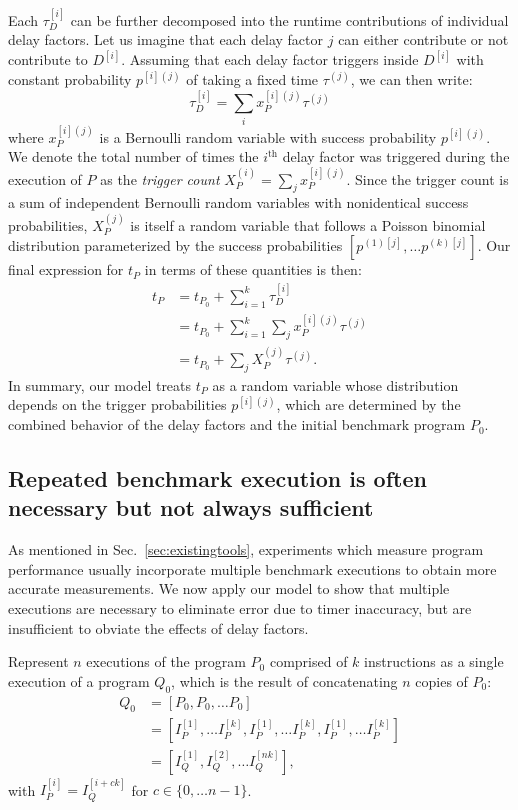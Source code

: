 \documentclass[conference]{IEEEtran}
\begin{document}
Each $\tau^{[i]}_D$ can be further decomposed into the runtime contributions of
individual delay factors. Let us imagine that each delay factor $j$ can either
contribute or not contribute to $D^{[i]}$. Assuming that each delay factor
triggers inside $D^{[i]}$ with constant probability $p^{[i](j)}$ of taking a
fixed time $\tau^{(j)}$, we can then write:
%
\begin{equation}
    \tau^{[i]}_D = \sum_{i} x_P^{[i](j)} \tau^{(j)}
\end{equation}
%
where $x_P^{[i](j)}$ is a Bernoulli random variable with success probability $p^{[i](j)}$.
We denote the total number of times the $i^{\textrm{th}}$ delay factor was triggered during
the execution of $P$ as the \textit{trigger count} $X_P^{(i)} = \sum_{j} x_P^{[i](j)}$.
Since the trigger count is a sum of independent Bernoulli random variables with nonidentical
success probabilities, $X_P^{(j)}$ is itself a random variable that follows a Poisson
binomial distribution parameterized by the success probabilities $\left[p^{(1)[j]}, \dots
p^{(k)[j]}\right]$. Our final expression for $t_P$ in terms of these quantities is then:
%
\begin{align}
t_P &= t_{P_0} + \sum_{i=1}^{k} \tau^{[i]}_D \nonumber \\
    &= t_{P_0} + \sum_{i=1}^{k} \sum_{j} x_P^{[i](j)} \tau^{(j)} \nonumber \\
    &= t_{P_0} + \sum_{j} X_P^{(j)} \tau^{(j)}.
\end{align}
%
In summary, our model treats $t_P$ as a random variable whose distribution
depends on the trigger probabilities $p^{[i](j)}$, which are determined by the
combined behavior of the delay factors and the initial benchmark program $P_0$.

\subsection{Repeated benchmark execution is often necessary but not always sufficient}
\label{sec:measuremodel}

As mentioned in Sec.~\ref{sec:existingtools}, experiments which measure program
performance usually incorporate multiple benchmark executions to obtain more
accurate measurements. We now apply our model to show that multiple executions
are necessary to eliminate error due to timer inaccuracy, but are insufficient
to obviate the effects of delay factors.

Represent $n$ executions of the program $P_0$ comprised of $k$ instructions as
a single execution of a program $Q_0$, which is the result of concatenating $n$
copies of $P_0$:
%
\begin{align}
Q_0 &= \left[P_0, P_0, \dots P_0 \right] \nonumber \\
    &= \left[I_{P}^{[1]}, \dots I_{P}^{[k]}, I_{P}^{[1]}, \dots I_{P}^{[k]}, I_{P}^{[1]}, \dots I_{P}^{[k]} \right] \nonumber \\
    &= \left[I_{Q}^{[1]}, I_{Q}^{[2]}, \dots I_{Q}^{[nk]} \right],
\end{align}
%
with $I_{P}^{[i]} = I_{Q}^{[i + ck]}$ for $c \in \{0, \dots n - 1\}$.
\end{document}
